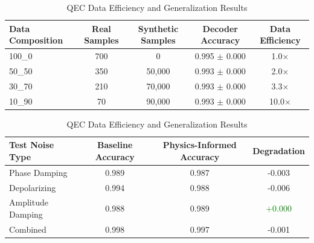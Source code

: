 \begin{table}[t]
\centering
\caption{QEC Data Efficiency and Generalization Results}
\label{tab:qec-efficiency}
\begin{tabular}{lcccc}
\hline
\textbf{Data Composition} & \textbf{Real Samples} & \textbf{Synthetic Samples} & \textbf{Decoder Accuracy} & \textbf{Data Efficiency} \\
\hline
100_0 & 700 & 0 & 0.995 $\pm$ 0.000 & 1.0$\times$ \\
50_50 & 350 & 50,000 & 0.993 $\pm$ 0.000 & 2.0$\times$ \\
30_70 & 210 & 70,000 & 0.993 $\pm$ 0.000 & 3.3$\times$ \\
10_90 & 70 & 90,000 & 0.993 $\pm$ 0.000 & 10.0$\times$ \\
\hline
\end{tabular}

\vspace{0.5cm}
\begin{tabular}{lccc}
\hline
\textbf{Test Noise Type} & \textbf{Baseline Accuracy} & \textbf{Physics-Informed Accuracy} & \textbf{Degradation} \\
\hline
Phase Damping & 0.989 & 0.987 & -0.003 \\
Depolarizing & 0.994 & 0.988 & -0.006 \\
Amplitude Damping & 0.988 & 0.989 & \textcolor{green}{+0.000} \\
Combined & 0.998 & 0.997 & -0.001 \\
\hline
\end{tabular}
\end{table}